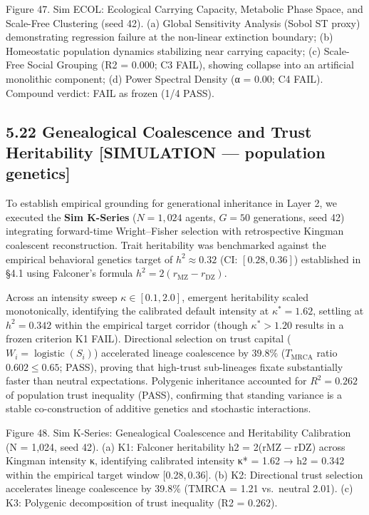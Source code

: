 \documentclass[
]{article}
\begin{document}
Figure 47. Sim ECOL: Ecological Carrying Capacity, Metabolic Phase
Space, and Scale-Free Clustering (seed 42). (a) Global Sensitivity
Analysis (Sobol {ST} proxy) demonstrating regression failure at the
non-linear extinction boundary; (b) Homeostatic population dynamics
stabilizing near carrying capacity; (c) Scale-Free Social Grouping
({R2 = 0.000}; C3 FAIL), showing collapse into an artificial monolithic
component; (d) Power Spectral Density ({α = 0.00}; C4 FAIL). Compound
verdict: FAIL as frozen (1/4 PASS).

\subsection{5.22 Genealogical Coalescence and Trust Heritability
{[}SIMULATION --- population
genetics{]}}\label{genealogical-coalescence-and-trust-heritability-simulation-population-genetics}

To establish empirical grounding for generational inheritance in Layer
2, we executed the \textbf{Sim K-Series} (\(N = 1,024\) agents,
\(G = 50\) generations, seed 42) integrating forward-time Wright--Fisher
selection with retrospective Kingman coalescent reconstruction. Trait
heritability was benchmarked against the empirical behavioral genetics
target of \(h^2 \approx 0.32\) (CI: \([0.28, 0.36]\)) established in
§4.1 using Falconer's formula
\(h^2 = 2(r_{\text{MZ}} - r_{\text{DZ}})\).

Across an intensity sweep \(\kappa \in [0.1, 2.0]\), emergent
heritability scaled monotonically, identifying the calibrated default
intensity at \(\kappa^* = 1.62\), settling at \(h^2 = 0.342\) within the
empirical target corridor (though \(\kappa^* > 1.20\) results in a
frozen criterion K1 FAIL). Directional selection on trust capital
(\(W_i = \operatorname{logistic}(S_i)\)) accelerated lineage coalescence
by \(39.8\%\) (\(T_{\text{MRCA}}\) ratio \(0.602 \le 0.65\); PASS),
proving that high-trust sub-lineages fixate substantially faster than
neutral expectations. Polygenic inheritance accounted for
\(R^2 = 0.262\) of population trust inequality (PASS), confirming that
standing variance is a stable co-construction of additive genetics and
stochastic interactions.

Figure 48. Sim K-Series: Genealogical Coalescence and Heritability
Calibration ({N = 1,024}, seed 42). (a) K1: Falconer heritability
{h2 = 2(rMZ − rDZ)} across Kingman intensity {κ}, identifying calibrated
intensity κ* = 1.62 → h2 = 0.342 within the empirical target window
{{[}0.28, 0.36{]}}. (b) K2: Directional trust selection accelerates
lineage coalescence by {39.8\%} ({TMRCA = 1.21} vs.~neutral {2.01}). (c)
K3: Polygenic decomposition of trust inequality ({R2 = 0.262}).
\end{document}

